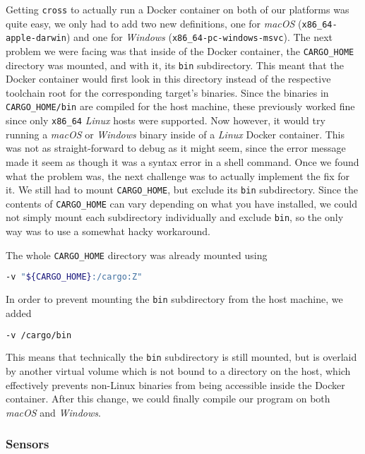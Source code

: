 Getting \texttt{cross} to actually run a Docker container on both of our platforms was quite easy,
we only had to add two new definitions, one for \textit{macOS} (\texttt{x86\_64-apple-darwin}) and
one for \textit{Windows} (\texttt{x86\_64-pc-windows-msvc}). The next problem we were facing was
that inside of the Docker container, the \texttt{CARGO\_HOME} directory was mounted, and with it,
its \texttt{bin} subdirectory. This meant that the Docker container would first look in this
directory instead of the respective toolchain root for the corresponding target's binaries. Since
the binaries in \texttt{CARGO\_HOME/bin} are compiled for the host machine, these previously worked
fine since only \texttt{x86\_64} \textit{Linux} hosts were supported. Now however, it would try
running a \textit{macOS} or \textit{Windows} binary inside of a \textit{Linux} Docker container.
This was not as straight-forward to debug as it might seem, since the error message made it seem as
though it was a syntax error in a shell command. Once we found what the problem was, the next
challenge was to actually implement the fix for it. We still had to mount \texttt{CARGO\_HOME}, but
exclude its \texttt{bin} subdirectory. Since the contents of \texttt{CARGO\_HOME} can vary depending
on what you have installed, we could not simply mount each subdirectory individually and exclude
\texttt{bin}, so the only way was to use a somewhat hacky workaround.

The whole \texttt{CARGO\_HOME} directory was already mounted using

\begin{lstlisting}[language=Bash]
-v "${CARGO_HOME}:/cargo:Z"
\end{lstlisting}

In order to prevent mounting the \texttt{bin} subdirectory from the host machine, we added

\begin{lstlisting}[language=Bash]
-v /cargo/bin
\end{lstlisting}

This means that technically the \texttt{bin} subdirectory is still mounted, but is overlaid by
another virtual volume which is not bound to a directory on the host, which effectively prevents
non-Linux binaries from being accessible inside the Docker container. After this change, we could
finally compile our program on both \textit{macOS} and \textit{Windows}.

\subsubsection{Sensors}

